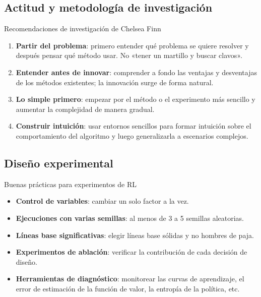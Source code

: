 \documentclass[a4paper]{article}
\begin{document}
\subsection{Actitud y metodología de investigación}

\begin{importantbox}{Recomendaciones de investigación de Chelsea Finn}
\begin{enumerate}
    \item \textbf{Partir del problema}: primero entender qué problema se quiere resolver y después pensar qué método usar. No «tener un martillo y buscar clavos».
    \item \textbf{Entender antes de innovar}: comprender a fondo las ventajas y desventajas de los métodos existentes; la innovación surge de forma natural.
    \item \textbf{Lo simple primero}: empezar por el método o el experimento más sencillo y aumentar la complejidad de manera gradual.
    \item \textbf{Construir intuición}: usar entornos sencillos para formar intuición sobre el comportamiento del algoritmo y luego generalizarla a escenarios complejos.
\end{enumerate}
\end{importantbox}

\subsection{Diseño experimental}

\begin{knowledgebox}{Buenas prácticas para experimentos de RL}
\begin{itemize}
    \item \textbf{Control de variables}: cambiar un solo factor a la vez.
    \item \textbf{Ejecuciones con varias semillas}: al menos de 3 a 5 semillas aleatorias.
    \item \textbf{Líneas base significativas}: elegir líneas base sólidas y no hombres de paja.
    \item \textbf{Experimentos de ablación}: verificar la contribución de cada decisión de diseño.
    \item \textbf{Herramientas de diagnóstico}: monitorear las curvas de aprendizaje, el error de estimación de la función de valor, la entropía de la política, etc.
\end{itemize}
\end{knowledgebox}
\end{document}
